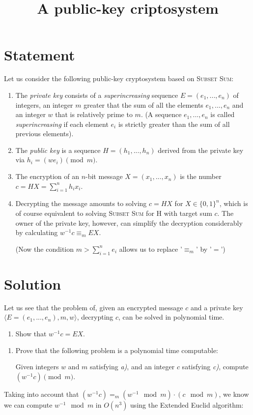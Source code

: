\documentclass[a4paper]{article}
\title{A public-key criptosystem}
\begin{document}
\maketitle
\section*{Statement}
Let us consider the following public-key cryptosystem based on \textsc{Subset Sum}:

\begin{enumerate}[label=\alph*)]
	\item The \emph{private key} consists of a \emph{superincreasing} sequence $E = (e_1, ..., e_n)$ of integers, an integer $m$ greater that the sum of all the elements $e_1, ..., e_n$ and an integer $w$ that is relatively prime to $m$. (A sequence $e_1, ..., e_n$ is called \emph{superincreasing} if each element $e_i$ is strictly greater than the sum of all previous elements).
	\item The \emph{public key} is a sequence $H = (h_1, ..., h_n)$ derived from the private key via $h_i = (we_i) \pmod{m}$.
	\item The encryption of an $n$-bit message $X = (x_1, ..., x_n)$ is the number $c = HX = \sum_{i=1}^n h_ix_i$.
	\item Decrypting the message amounts to solving $c = HX$ for $X \in \{0, 1\}^n$, which is of course equivalent to solving \textsc{Subset Sum} for H with target sum $c$. The owner of the private key, however, can simplify the decryption considerably by calculating $w^{-1}c \equiv_m EX$.
	
	(Now the condition $m > \sum_{i=1}^n e_i$ allows us to replace '$\equiv_m$' by '$=$')
\end{enumerate}

\section*{Solution}
Let us see that the problem of, given an encrypted message $c$ and a private key $\langle E = (e_1, ..., e_n), m, w \rangle$, decrypting $c$, can be solved in polynomial time.
\begin{enumerate}[label=\roman*)]
	\item Show that $w^{-1}c = EX$.
\end{enumerate}

\begin{enumerate}[resume, label=\roman*)]
	\item Prove that the following problem is a polynomial time computable:
	
	Given integers $w$ and $m$ satisfying \emph{a)}, and an integer $c$ satisfying \emph{c)}, compute $(w^{-1}c) \pmod{m}$.
\end{enumerate}
Taking into account that $(w^{-1}c)=_m(w^{-1}\mod{m})·(c \mod{m})$, we know we can compute $w^{-1}\mod{m}$ in $O(n^3)$ using the Extended Euclid algorithm:
\end{document}

